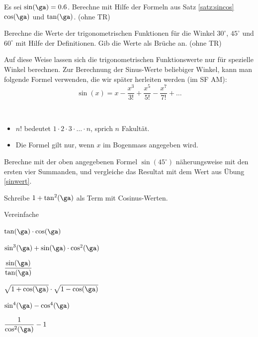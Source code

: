\documentclass[%
11pt,%
twoside,%
titlepage,%
german,%
headsepline%
]{scrartcl}
\begin{document}
\begin{ueb}[Kopfrechnen]
  Es sei $\sin(\ga) = 0.6$. Berechne mit Hilfe der Formeln aus Satz \ref{satz:sincos} $\cos(\ga)$ und $\tan(\ga)$. (ohne TR)
\end{ueb}

\begin{ueb}[exakt]\label{sinwert}
  Berechne die Werte der trigonometrischen Funktionen für die
  Winkel $30^\circ$, $45^\circ$ und $60^\circ$ mit Hilfe der Definitionen. Gib die Werte als Brüche an. (ohne TR)
\end{ueb}

\begin{bem}
Auf diese Weise lassen sich die trigonometrischen Funktionswerte nur
für spe\-ziel\-le Winkel berechnen. Zur Berechnung der Sinus-Werte
beliebiger Winkel, kann man folgende Formel verwenden, die wir
später herleiten werden (im SF AM):
$$\sin(x) = x-\frac{x^3}{3!}+\frac{x^5}{5!}-\frac{x^7}{7!}+\dots$$
\end{bem}
\begin{bem}
\
  \begin{itemize}
    \item $n!$ bedeutet $1\cdot2\cdot3\cdot\dots\cdot n$, sprich
    \glqq $n$ Fakultät\grqq.
    \item Die Formel gilt nur, wenn $x$ im Bogenmass angegeben wird.
  \end{itemize}
\end{bem}
\begin{ueb}
  Berechne mit der oben angegebenen Formel $\sin(45^\circ)$
  nä\-he\-rungs\-wei\-se mit den ersten vier Summanden, und vergleiche
  das Resultat mit dem Wert aus Übung \ref{sinwert}.
\end{ueb}

\begin{ueb}[umschreiben]
  Schreibe $1+\tan^2(\ga)$ als Term mit Cosinus-Werten.
\end{ueb}
\begin{ueb}[vereinfachen]
  Vereinfache
  
  \begin{minipage}{0.49\textwidth}
  \begin{enumeratea}
    \item $\tan(\ga)\cdot\cos(\ga)$
    \item $\sin^3(\ga)+\sin(\ga)\cdot\cos^2(\ga)$
    \item $\dfrac{\sin(\ga)}{\tan(\ga)}$
    \end{enumeratea}
    \end{minipage}
    \begin{minipage}{0.49\textwidth}
    \begin{enumeratea}
    \setcounter{enumi}{3}
    \item $\sqrt{1+\cos(\ga)}\cdot\sqrt{1-\cos(\ga)}$
    \item $\sin^4(\ga)-\cos^4(\ga)$
    \item $\dfrac{1}{\cos^2(\ga)}-1$
  \end{enumeratea}
  \end{minipage}
\end{ueb}
\end{document}
